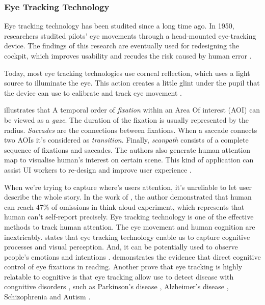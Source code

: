 \subsubsection{Eye Tracking Technology}


Eye tracking technology has been studited since a long time ago. In 1950, researchers studited pilots' eye movements through a head-mounted eye-tracking device. The findings of this research are eventually used for redesigning the cockpit, which improves usability and recudes the risk caused by human error \citep{Fitts2005Cockpit, Cooke2005EyeTrackingUsability}.

Today, most eye tracking technologies use corneal reflection, which uses a light source to illuminate the eye. This action creates a little glint under the pupil that the device can use to calibrate and track eye movement \citep{Schall2014EyeTrackingIntro, Fitts2005Cockpit}.

\citet{Blascheck2014VisualisingEyeTracking} illustrates that A temporal order of \textit{fixation} within an Area Of interest (AOI) can be viewed as a \textit{gaze}. The duration of the fixation is usually represented by the radius. \textit{Saccades} are the connections between fixations. When a saccade connects two AOIs it's considered as  \textit{transition}. Finally, \textit{scanpath} consists of a complete sequence of fixations and saccades. The authors also generate human attention map to visualise human's interest on certain scene. This kind of application can assist UI workers to re-design and improve user experience \citep{Schall2014EyeTrackingIntro}.

When we're trying to capture where's users attention, it's unreliable to let user describe the whole story. In the work of \citet{Guan2006ThinkAloud}, the author demonstrated that human can reach 47\% of omissions in think-aloud experiment, which represents that human can't self-report precisely. Eye tracking technology is one of the effective methods to track human attention. The eye movement and human cognition are inextricably. \citet{Schall2014EyeTrackingIntro} states that eye tracking technology enable us to capture cognitive processes and visual perception. And, it can be potentially used to observe people's emotions and intentions \citep{Harezlak2018EyeTrackingInMedicine}. \citet{Rayner2015EvidenceCongnitiveFixation} demonstrates the evidence that direct cognitive control of eye fixations in reading. Another prove that eye tracking is highly relatable to cognitive is that eye tracking allow use to detect disease with congnitive disorders \citep{Harezlak2018EyeTrackingInMedicine}, such as Parkinson's disease \citep{S2016Parkinson}, Alzheimer's disease \citep{Crawford2015Alzheimer},
Schizophrenia \citep{Levy2010Schizophrenia} and Autism \citep{Belen2021Autism}.


